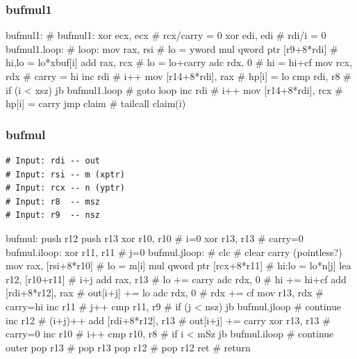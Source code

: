 \subsubsection{bufmul1}

\begin{asm}
bufmul1:                                    # bufmul1:
	xor	ecx, ecx                    #   rcx/carry = 0
	xor	edi, edi                    #   rdi/i     = 0
bufmul1.loop:                               # loop:
	mov	rax, rsi                    #   lo    = yword
	mul	qword ptr [r9+8*rdi]        #   hi,lo = lo*xbuf[i]
	add	rax, rcx                    #   lo    = lo+carry
	adc	rdx, 0                      #   hi    = hi+cf
	mov	rcx, rdx                    #   carry = hi
	inc	rdi                         #   i++
	mov	[r14+8*rdi], rax            #   hp[i] = lo
	cmp	rdi, r8                     #   if (i < xsz)
	jb	bufmul1.loop                #     goto loop
	inc	rdi                         #   i++
	mov	[r14+8*rdi], rcx            #   hp[i] = carry
	jmp	claim                       #   tailcall claim(i)
\end{asm}

\subsubsection{bufmul}

\begin{verbatim}
# Input: rdi -- out
# Input: rsi -- m (xptr)
# Input: rcx -- n (yptr)
# Input: r8  -- msz
# Input: r9  -- nsz
\end{verbatim}

\begin{asm}
bufmul:
	push	r12
	push	r13
	xor	r10, r10                  # i=0
	xor	r13, r13                  # carry=0
bufmul.iloop:
	xor	r11, r11                  # j=0
bufmul.jloop:
	# clc                             # clear carry (pointless?)
	mov	rax, [rsi+8*r10]          # lo = m[i]
	mul	qword ptr [rcx+8*r11]     # hi:lo = lo*n[j]
	lea	r12, [r10+r11]            # i+j
	add	rax, r13                  # lo += carry
	adc	rdx, 0                    # hi += hi+cf
	add	[rdi+8*r12], rax          # out[i+j] += lo
	adc	rdx, 0                    # rdx += cf
	mov	r13, rdx                  # carry=hi
	inc	r11                       # j++
	cmp	r11, r9                   # if (j < nsz)
	jb	bufmul.jloop              #     continue
	inc	r12                       # (i+j)++
	add	[rdi+8*r12], r13          # out[i+j] += carry
	xor	r13, r13                  # carry=0
	inc	r10                       # i++
	cmp	r10, r8                   # if i < mSz
	jb	bufmul.iloop              #     continue outer
	pop	r13                       # pop r13
	pop	r12                       # pop r12
	ret                               # return
\end{asm}

